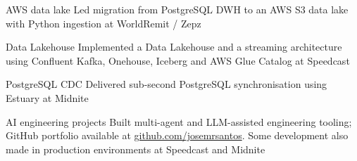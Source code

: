 


\begin{cvskillsnoncentered}

\cvskill
    {AWS data lake} %
    {Led migration from PostgreSQL DWH to an AWS S3 data lake with Python ingestion at WorldRemit / Zepz}

\cvskill
    {Data Lakehouse} %
    {Implemented a Data Lakehouse and a streaming architecture using Confluent Kafka, Onehouse, Iceberg and AWS Glue Catalog at Speedcast}

\cvskill
    {PostgreSQL CDC} %
    {Delivered sub-second PostgreSQL synchronisation using Estuary at Midnite}

\cvskill
    {AI engineering projects} %
    {Built multi-agent and LLM-assisted engineering tooling; GitHub portfolio available at \href{https://github.com/josemrsantos}{github.com/josemrsantos}. Some development also made in production environments at Speedcast and Midnite}

\end{cvskillsnoncentered}
